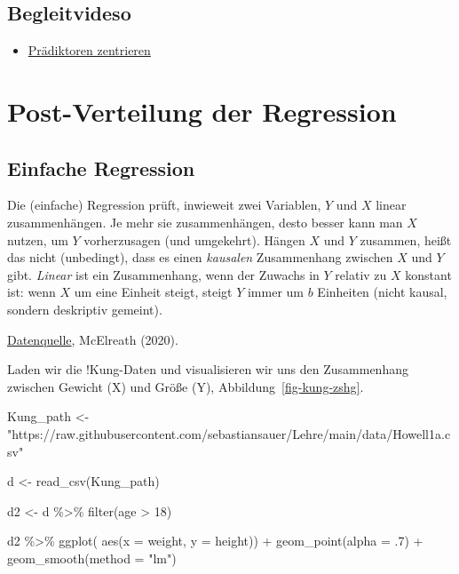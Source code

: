 \documentclass[
  a4paper,
  DIV=11]{scrreprt}
\newenvironment{Shaded}{\begin{snugshade}}{\end{snugshade}}
\newcommand{\AttributeTok}[1]{\textcolor[rgb]{0.40,0.45,0.13}{#1}}
\newcommand{\DecValTok}[1]{\textcolor[rgb]{0.68,0.00,0.00}{#1}}
\newcommand{\FunctionTok}[1]{\textcolor[rgb]{0.28,0.35,0.67}{#1}}
\newcommand{\NormalTok}[1]{\textcolor[rgb]{0.00,0.23,0.31}{#1}}
\newcommand{\OtherTok}[1]{\textcolor[rgb]{0.00,0.23,0.31}{#1}}
\newcommand{\SpecialCharTok}[1]{\textcolor[rgb]{0.37,0.37,0.37}{#1}}
\newcommand{\StringTok}[1]{\textcolor[rgb]{0.13,0.47,0.30}{#1}}
\providecommand{\tightlist}{%
  \setlength{\itemsep}{0pt}\setlength{\parskip}{0pt}}\usepackage{longtable,booktabs,array}
\theoremstyle{definition}
\theoremstyle{remark}
\begin{document}
\hypertarget{begleitvideso}{%
\subsection{Begleitvideso}\label{begleitvideso}}

\begin{itemize}
\tightlist
\item
  \href{https://youtu.be/3Z1dXPO_MSE}{Prädiktoren zentrieren}
\end{itemize}

\hypertarget{post-verteilung-der-regression}{%
\section{Post-Verteilung der
Regression}\label{post-verteilung-der-regression}}

\hypertarget{einfache-regression}{%
\subsection{Einfache Regression}\label{einfache-regression}}

Die (einfache) Regression prüft, inwieweit zwei Variablen, \(Y\) und
\(X\) linear zusammenhängen. Je mehr sie zusammenhängen, desto besser
kann man \(X\) nutzen, um \(Y\) vorherzusagen (und umgekehrt). Hängen
\(X\) und \(Y\) zusammen, heißt das nicht (unbedingt), dass es einen
\emph{kausalen} Zusammenhang zwischen \(X\) und \(Y\) gibt.
\emph{Linear} ist ein Zusammenhang, wenn der Zuwachs in \(Y\) relativ zu
\(X\) konstant ist: wenn \(X\) um eine Einheit steigt, steigt \(Y\)
immer um \(b\) Einheiten (nicht kausal, sondern deskriptiv gemeint).

\href{https://raw.githubusercontent.com/sebastiansauer/Lehre/main/data/Howell1a.csv}{Datenquelle},
McElreath (2020).

Laden wir die !Kung-Daten und visualisieren wir uns den Zusammenhang
zwischen Gewicht (X) und Größe (Y), Abbildung~\ref{fig-kung-zshg}.

\begin{Shaded}
\begin{Highlighting}[]
\NormalTok{Kung\_path }\OtherTok{\textless{}{-}} \StringTok{"https://raw.githubusercontent.com/sebastiansauer/Lehre/main/data/Howell1a.csv"}

\NormalTok{d }\OtherTok{\textless{}{-}} \FunctionTok{read\_csv}\NormalTok{(Kung\_path)  }

\NormalTok{d2 }\OtherTok{\textless{}{-}} 
\NormalTok{  d }\SpecialCharTok{\%\textgreater{}\%} 
  \FunctionTok{filter}\NormalTok{(age }\SpecialCharTok{\textgreater{}} \DecValTok{18}\NormalTok{) }

\NormalTok{d2 }\SpecialCharTok{\%\textgreater{}\%} 
  \FunctionTok{ggplot}\NormalTok{(}
       \FunctionTok{aes}\NormalTok{(}\AttributeTok{x =}\NormalTok{ weight, }\AttributeTok{y =}\NormalTok{ height)) }\SpecialCharTok{+}
  \FunctionTok{geom\_point}\NormalTok{(}\AttributeTok{alpha =}\NormalTok{ .}\DecValTok{7}\NormalTok{) }\SpecialCharTok{+}
  \FunctionTok{geom\_smooth}\NormalTok{(}\AttributeTok{method =} \StringTok{"lm"}\NormalTok{)}
\end{Highlighting}
\end{Shaded}
\end{document}
